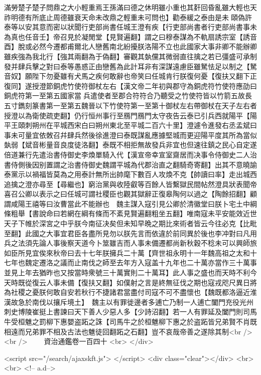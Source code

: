 滿勞楚子楚子問鼎之大小輕重焉王孫滿曰德之休明雖小重也其姧回昏亂雖大輕也天祚明德有所底止周德雖衰天命未改鼎之輕重未可問也】勸泰緩之泰由是未頤偽許泰等以安其意而密以狀聞行吏部尚書任城王澄有疾【行吏部尚書者行吏部尚書事未為真也任音壬】帝召見於凝閒堂【見賢遍翻】謂之曰穆泰謀為不軌扇誘宗室【誘音酉】脫或必然今遷都甫爾北人戀舊南北紛擾朕洛陽不立也此國家大事非卿不能辦卿雖疾強為我北行【強其兩翻為于偽翻】審觀其埶儻其微弱直往擒之若已彊盛可承制發并肆兵擊之對曰泰等愚惑正由戀舊為此計耳非有深謀遠慮臣雖駑怯足以制之【駑音奴】願陛下勿憂雖有犬馬之疾何敢辭也帝笑曰任城肯行朕復何憂【復扶又翻下正復同】遂授澄節銅虎竹使符御杖左右【漢文帝二年初與郡守為銅虎符竹使符應劭曰銅虎符第一至第五國家當兵遣使者至郡合符符合乃聽受之竹使符皆以竹箭五故長五寸鐫刻篆書第一至第五魏晉以下竹使符第一至第十御杖左右帶御杖在天子左右者授澄以為衛使疏吏翻】仍行恒州事行至鴈門鴈門太守夜告云泰已引兵西就陽平【陽平王頤刺朔州在平城西宋白曰朔州東北至平城二百六十里】澄遽令進發右丞孟斌曰事未可量宜依敇召幷肆兵然後徐進澄曰泰既謀亂應據堅城而更迎陽平度其所為當似埶弱【斌音彬量音良度徒洛翻】泰既不相拒無故發兵非宜也但速往鎮之民心自定遂倍道兼行先遣治書侍御史李煥單騎入代【漢宣帝幸宣室齋居而决事令侍御史二人治書侍側後因别置謂之治書侍御史魏謂平城為代郡治直之翻騎奇寄翻】出其不意曉諭泰黨示以禍福皆莫為之用泰計無所出帥麾下數百人攻煥不克【帥讀曰率】走出城西追擒之澄亦尋至【尋繼也】窮治黨與收陸叡等百餘人皆繫獄民間帖然澄具狀表聞帝喜召公卿以表示之曰任城可謂社稷臣也觀其獄辭正復皋陶何以過之【陶餘招翻】顧謂咸陽王禧等曰汝曹當此不能辦也　魏主謀入寇引見公卿於清徽堂曰朕卜宅土中綱條粗舉【書說命曰若網在綱有條而不紊見賢遍翻粗坐五翻】唯南寇未平安能效近世天子下帷於深宮之中乎朕今南征决矣但未知早晩之期比來術者皆云今往必克【比毗至翻】此國之大事宜君臣各盡所見勿以朕先言而依違於前同異於後也李冲對曰凡用兵之法須先論人事後察天道今卜筮雖吉而人事未備遷都尚新秋穀不稔未可以興師旅如臣所見宜俟來秋帝曰去十七年朕擁兵二十萬【齊世祖永明十一年魏高祖之太和十七年也魏定遷洛之議而止南伐之師至去年方入寇盖十九年也二十萬亦當作三十萬事並見上年去猶昨也又按當時衆號三十萬實則二十萬耳】此人事之盛也而天時不利今天時既從復云人事未備【復扶又翻】如僕射之言是終無征伐之期也寇戎咫尺異日將為社稷之憂朕何敢自安若秋行不捷諸君當盡付司寇不可不盡懷也【魏既都洛逼近淮漢故急於南伐以攘斥境土】　魏主以有罪徙邊者多逋亡乃制一人逋亡闔門充役光州刺史博陵崔挺上書諫曰天下善人少惡人多【少詩沼翻】若一人有罪延及闔門則司馬牛受桓魋之罰柳下惠嬰盗跖之誅【司馬牛之於桓魋柳下惠之於盗跖皆兄弟賢不肖既相遠而兄弟罪不相及古法也魋徒回翻跖之石翻】豈不哀哉帝善之遂除其制<br />
<br />
　　資治通鑑卷一百四十  <br>
   </div> 

<script src="/search/ajaxskft.js"> </script>
 <div class="clear"></div>
<br>
<br>
 <!-- a.d-->

